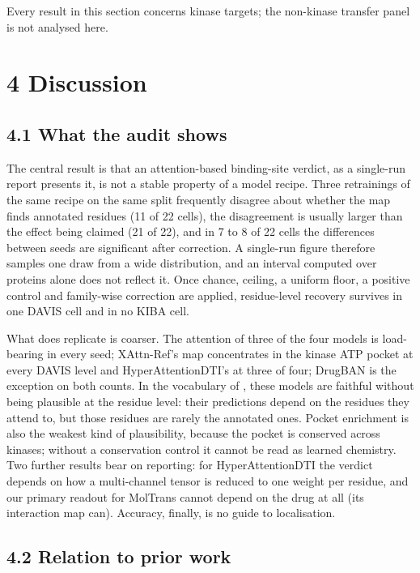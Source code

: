 Every result in this section concerns kinase targets; the non-kinase transfer panel is not analysed here.

\section{4 Discussion}\label{discussion}

\subsection{4.1 What the audit shows}\label{what-the-audit-shows}

The central result is that an attention-based binding-site verdict, as a single-run report presents it, is not a stable property of a model recipe. Three retrainings of the same recipe on the same split frequently disagree about whether the map finds annotated residues (11 of 22 cells), the disagreement is usually larger than the effect being claimed (21 of 22), and in 7 to 8 of 22 cells the differences between seeds are significant after correction. A single-run figure therefore samples one draw from a wide distribution, and an interval computed over proteins alone does not reflect it. Once chance, ceiling, a uniform floor, a positive control and family-wise correction are applied, residue-level recovery survives in one DAVIS cell and in no KIBA cell.

What does replicate is coarser. The attention of three of the four models is load-bearing in every seed; XAttn-Ref's map concentrates in the kinase ATP pocket at every DAVIS level and HyperAttentionDTI's at three of four; DrugBAN is the exception on both counts. In the vocabulary of \citet{Jacovi2020}, these models are faithful without being plausible at the residue level: their predictions depend on the residues they attend to, but those residues are rarely the annotated ones. Pocket enrichment is also the weakest kind of plausibility, because the pocket is conserved across kinases; without a conservation control it cannot be read as learned chemistry. Two further results bear on reporting: for HyperAttentionDTI the verdict depends on how a multi-channel tensor is reduced to one weight per residue, and our primary readout for MolTrans cannot depend on the drug at all (its interaction map can). Accuracy, finally, is no guide to localisation.

\subsection{4.2 Relation to prior work}\label{relation-to-prior-work}


